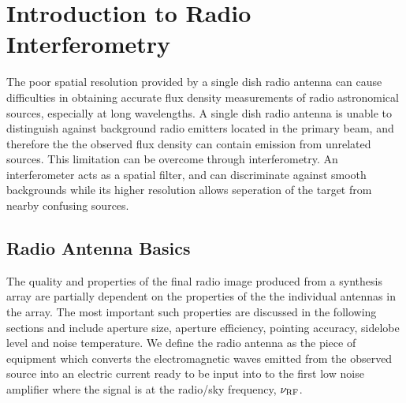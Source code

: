 

\chapter{Introduction to Radio Interferometry} 
\label{chap:2}

The poor spatial resolution provided by a single dish radio antenna can cause difficulties in obtaining accurate flux density measurements of radio astronomical sources, especially at long wavelengths. A single dish radio antenna is unable to distinguish against background radio emitters located in the primary beam, and therefore the the observed flux density can contain emission from unrelated sources. This limitation can be overcome through interferometry. An interferometer acts as a spatial filter, and can discriminate against smooth backgrounds while its higher resolution allows seperation of the target from nearby confusing sources. 

\section{Radio Antenna Basics}\label{sec:1}
The quality and properties of the final radio image produced from a synthesis array are partially dependent on the properties of the the individual antennas in the array. The most important such properties are discussed in the following sections and include aperture size, aperture efficiency, pointing accuracy, sidelobe level and noise temperature. We define the radio antenna as the piece of equipment which converts the electromagnetic waves emitted from the observed source into an electric current ready to be input into to the first low noise amplifier where the signal is at the radio/sky frequency, $\nu _{\rm{RF}}$.
